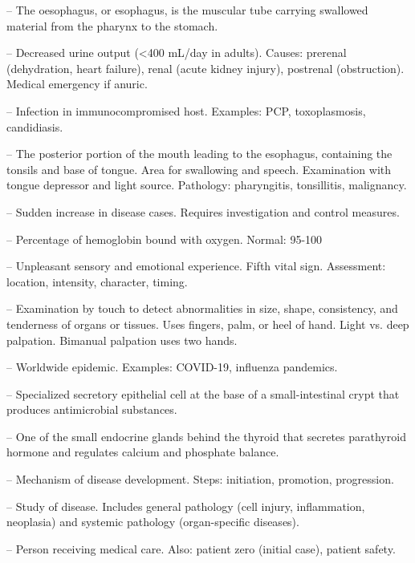 -- The oesophagus, or esophagus, is the muscular tube carrying swallowed material from the pharynx to the stomach.

-- Decreased urine output (<400 mL/day in adults). Causes: prerenal (dehydration, heart failure), renal (acute kidney injury), postrenal (obstruction). Medical emergency if anuric.

-- Infection in immunocompromised host. Examples: PCP, toxoplasmosis, candidiasis.

-- The posterior portion of the mouth leading to the esophagus, containing the tonsils and base of tongue. Area for swallowing and speech. Examination with tongue depressor and light source. Pathology: pharyngitis, tonsillitis, malignancy.

-- Sudden increase in disease cases. Requires investigation and control measures.

-- Percentage of hemoglobin bound with oxygen. Normal: 95-100%

-- Unpleasant sensory and emotional experience. Fifth vital sign. Assessment: location, intensity, character, timing.

-- Examination by touch to detect abnormalities in size, shape, consistency, and tenderness of organs or tissues. Uses fingers, palm, or heel of hand. Light vs. deep palpation. Bimanual palpation uses two hands.

-- Worldwide epidemic. Examples: COVID-19, influenza pandemics.

-- Specialized secretory epithelial cell at the base of a small-intestinal crypt that produces antimicrobial substances.

-- One of the small endocrine glands behind the thyroid that secretes parathyroid hormone and regulates calcium and phosphate balance.

-- Mechanism of disease development. Steps: initiation, promotion, progression.

-- Study of disease. Includes general pathology (cell injury, inflammation, neoplasia) and systemic pathology (organ-specific diseases).

-- Person receiving medical care. Also: patient zero (initial case), patient safety.

